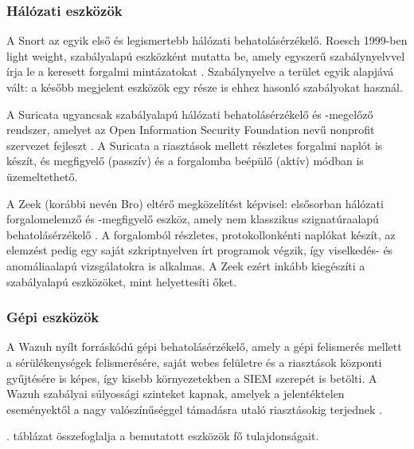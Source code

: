 \subsubsection{Hálózati eszközök}
A Snort az egyik első és legismertebb hálózati behatolásérzékelő. Roesch 1999-ben light weight, szabályalapú eszközként mutatta be, amely egyszerű szabálynyelvvel írja le a keresett forgalmi mintázatokat \cite{roesch1999snort}. Szabálynyelve a terület egyik alapjává vált: a később megjelent eszközök egy része is ehhez hasonló szabályokat használ. 

A Suricata ugyancsak szabályalapú hálózati behatolásérzékelő és -megelőző rendszer, amelyet az Open Information Security Foundation nevű nonprofit szervezet fejleszt \cite{suricatadocs}. A Suricata a riasztások mellett részletes forgalmi naplót is készít, és megfigyelő (passzív) és a forgalomba beépülő (aktív) módban is üzemeltethető\cite{suricatadocs}.

A Zeek (korábbi nevén Bro) eltérő megközelítést képvisel: elsősorban hálózati forgalomelemző és -megfigyelő eszköz, amely nem klasszikus
szignatúraalapú behatolásérzékelő \cite{zeekdocs}. A forgalomból részletes, protokollonkénti naplókat készít, az elemzést pedig egy saját szkriptnyelven írt programok végzik, így viselkedés- és anomáliaalapú vizsgálatokra is alkalmas. A Zeek ezért inkább kiegészíti a szabályalapú eszközöket, mint helyettesíti őket.

\subsubsection{Gépi eszközök}
A Wazuh nyílt forráskódú gépi behatolásérzékelő, amely a gépi felismerés mellett a sérülékenységek felismerésére, saját webes felületre és a riasztások központi gyűjtésére is képes, így kisebb környezetekben a \ac{SIEM} szerepét is betölti. A Wazuh szabályai súlyossági szinteket kapnak, amelyek a jelentéktelen eseményektől a nagy valószínűséggel támadásra utaló riasztásokig terjednek \cite{wazuhrules}.

\Az{\ref{tab:ids-eszkozok}}. táblázat összefoglalja a bemutatott eszközök fő tulajdonságait.

